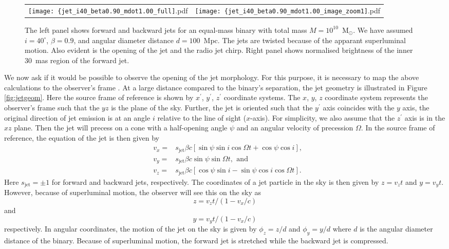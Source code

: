 \documentclass[a4paper,fleqn,usenatbib]{mnras}
\begin{document}
\begin{figure*}
\begin{center}
  \begin{tabular}{cc}
    \texttt{[image: \{jet\_i40\_beta0.90\_mdot1.00\_full]}.pdf} &
    \texttt{[image: \{jet\_i40\_beta0.90\_mdot1.00\_image\_zoom1]}.pdf}
  \end{tabular}
\end{center}
\caption{The left panel shows forward and backward jets for an
  equal-mass binary with total mass $M=10^{10}$~M$_\odot$.  We have
  assumed $i=40^\circ$, $\beta=0.9$, and angular diameter distance $d
  = 100$~Mpc.  The jets are twisted because of the apparant
  superluminal motion.  Also evident is the opening of the jet and the
  radio jet chirp.  Right panel shows normalised brightness of the
  inner 30~mas region of the forward jet.}
\label{fig:jet_mdot1.0}
\end{figure*}

We now ask if it would be possible to observe the opening of the jet
morphology.  For this purpose, it is necessary to map the above
calculations to the observer's frame \citep{1982ApJ...262..478G}.  At
a large distance compared to the binary's separation, the jet geometry
is illustrated in Figure \ref{fig:jetgeom}.  Here the source frame of
reference is shown by $x^\prime$, $y^\prime$, $z^\prime$ coordinate
systems.  The $x$, $y$, $z$ coordinate system represents the
observer's frame such that the $yz$ is the plane of the sky.  Further,
the jet is oriented such that the $y^\prime$ axis coincides with the
$y$ axis, the original direction of jet emission is at an angle $i$
relative to the line of sight ($x$-axis).  For simplicity, we also
assume that the $z^\prime$ axis is in the $xz$ plane.  Then the jet
will precess on a cone with a half-opening angle $\psi$ and an angular
velocity of precession $\Omega$.  In the source frame of reference,
the equation of the jet is then given by \citep{1981ApJ...246L.141H}
\begin{eqnarray}
  &v_x=&s_\mathrm{jet}\beta c\left[\sin\psi\sin i\cos\Omega t+\cos\psi\cos i\right],\\
  &v_y=&s_\mathrm{jet}\beta c\sin\psi\sin\Omega t,~\,\mathrm{and}\\
  &v_z=&s_\mathrm{jet}\beta c\left[\cos\psi\sin i-\sin\psi\cos i\cos\Omega t\right]. 
\end{eqnarray}
Here $s_\mathrm{jet}=\pm 1$ for forward and backward jets,
respectively.  The coordinates of a jet particle in the sky is then
given by $z=v_zt$ and $y=v_yt$.  However, because of superluminal
motion, the observer will see this on the sky as
\begin{equation}
  z=v_zt/(1-v_x/c)
\end{equation}
and
\begin{equation}
  y=v_yt/(1-v_x/c)
\end{equation}
respectively.  In angular coordinates, the motion of the jet on the
sky is given by $\phi_z=z/d$ and $\phi_y=y/d$ where $d$ is the angular
diameter distance of the binary.  Because of superluminal motion, the
forward jet is stretched while the backward jet is compressed.
\end{document}
